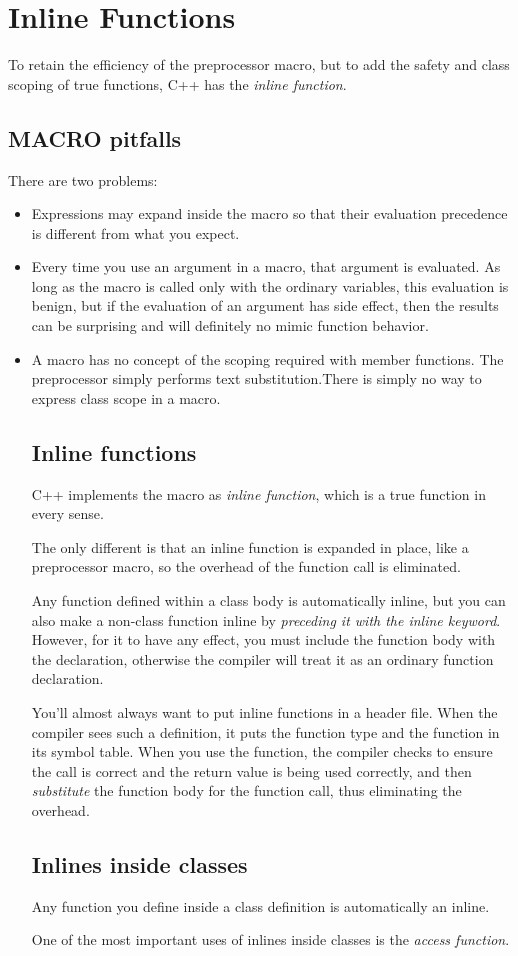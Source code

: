\documentclass[11pt, a4paper]{book}
\begin{document}
\chapter{Inline Functions}
To retain the efficiency of the preprocessor macro, but to add the safety and
class scoping of true functions, C++ has the \emph{inline function}. 
\section{MACRO pitfalls}
There are two problems:
\begin{itemize}
\item Expressions may expand inside the macro so that their evaluation
precedence is different from what you expect.
\item Every time you use an argument in a macro, that argument is evaluated. As
long as the macro is called only with the ordinary variables, this evaluation is
benign, but if the evaluation of an argument has side effect, then the results
can be surprising and will definitely no mimic function behavior.
\item A macro has no concept of the scoping required with member functions. The
preprocessor simply performs text substitution.There is simply no way to express
class scope in a macro.
\section{Inline functions}
C++ implements the macro as \emph{inline function}, which is a true function in
every sense.

The only different is that an inline function is expanded in place, like a
preprocessor macro, so the overhead of the function call is eliminated.

Any function defined within a class body is automatically inline, but you can
also make a non-class function inline by \emph{preceding it with the inline
keyword}. However, for it to have any effect, you must include the function body
with the declaration, otherwise the compiler will treat it as an ordinary
function declaration.

You'll almost always want to put inline functions in a header file. When the
compiler sees such a definition, it puts the function type and the function in
its symbol table. When you use the function, the compiler checks to ensure the
call is correct and the return value is being used correctly, and then
\emph{substitute} the function body for the function call, thus eliminating the
overhead.
\section{Inlines inside classes}
Any function you define inside a class definition is automatically an inline.

One of the most important uses of inlines inside classes is the \emph{access
function}.
\end{itemize}
\end{document}
